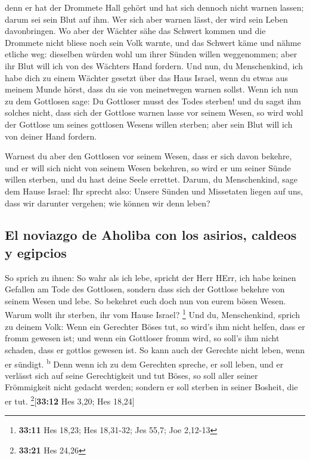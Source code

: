  denn er hat der Drommete Hall gehört und hat sich dennoch
nicht warnen lassen; darum sei sein Blut auf ihm. Wer sich aber warnen
lässt, der wird sein Leben davonbringen.  Wo aber der
Wächter sähe das Schwert kommen und die Drommete nicht bliese noch sein
Volk warnte, und das Schwert käme und nähme etliche weg: dieselben
würden wohl um ihrer Sünden willen weggenommen; aber ihr Blut will ich
von des Wächters Hand fordern.  Und nun, du Menschenkind,
ich habe dich zu einem Wächter gesetzt über das Haus Israel, wenn du
etwas aus meinem Munde hörst, dass du sie von meinetwegen warnen sollst.
 Wenn ich nun zu dem Gottlosen sage: Du Gottloser musst
des Todes sterben! und du sagst ihm solches nicht, dass sich der
Gottlose warnen lasse vor seinem Wesen, so wird wohl der Gottlose um
seines gottlosen Wesens willen sterben; aber sein Blut will ich von
deiner Hand fordern.

 Warnest du aber den Gottlosen vor seinem Wesen, dass er
sich davon bekehre, und er will sich nicht von seinem Wesen bekehren, so
wird er um seiner Sünde willen sterben, und du hast deine Seele
errettet.  Darum, du Menschenkind, sage dem Hause Israel:
Ihr sprecht also: Unsere Sünden und Missetaten liegen auf uns, dass wir
darunter vergehen; wie können wir denn leben?

\hypertarget{el-noviazgo-de-aholiba-con-los-asirios-caldeos-y-egipcios}{%
\subsection{El noviazgo de Aholiba con los asirios, caldeos y
egipcios}\label{el-noviazgo-de-aholiba-con-los-asirios-caldeos-y-egipcios}}

 So sprich zu ihnen: So wahr als ich lebe, spricht der
Herr HErr, ich habe keinen Gefallen am Tode des Gottlosen, sondern dass
sich der Gottlose bekehre von seinem Wesen und lebe. So bekehret euch
doch nun von eurem bösen Wesen. Warum wollt ihr sterben, ihr vom Hause
Israel? \footnote{\textbf{33:11} Hes 18,23; Hes 18,31-32; Jes 55,7; Joe
  2,12-13}  Und du, Menschenkind, sprich zu deinem Volk:
Wenn ein Gerechter Böses tut, so wird's ihm nicht helfen, dass er fromm
gewesen ist; und wenn ein Gottloser fromm wird, so soll's ihm nicht
schaden, dass er gottlos gewesen ist. So kann auch der Gerechte nicht
leben, wenn er sündigt. \textsuperscript{b}  Denn wenn
ich zu dem Gerechten spreche, er soll leben, und er verlässt sich auf
seine Gerechtigkeit und tut Böses, so soll aller seiner Frömmigkeit
nicht gedacht werden; sondern er soll sterben in seiner Bosheit, die er
tut. \footnote{\textbf{33:21} Hes 24,26}{[}\textbf{33:12} Hes 3,20; Hes
18,24{]}

